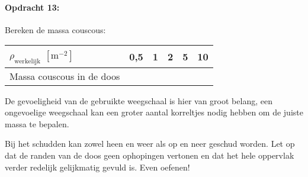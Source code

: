 \bigskip{}


\begin{minipage}[t]{1\columnwidth}%

\paragraph{Opdracht 13:}

Bereken de massa couscous:\smallskip{}

\begin{tabular}{|x{.3\textwidth}|x{.1\textwidth}|x{.1\textwidth}
                |x{.1\textwidth}|x{.1\textwidth}|x{.1\textwidth}|}
    \hline
    $\rho_\textrm{werkelijk}$ $\left[\mathrm{m^{-2}}\right]$ & 0,5 & 1 & 2 & 5 & 10 \\
    \hline
    Massa couscous in de doos &  &  &  &  & \\
    \hline
\end{tabular}

\smallskip{}


De gevoeligheid van de gebruikte weegschaal is hier van groot belang,
een ongevoelige weegschaal kan een groter aantal korreltjes nodig
hebben om de juiste massa te bepalen.%
\end{minipage}

\bigskip{}


Bij het schudden kan zowel heen en weer als op en neer geschud worden.
Let op dat de randen van de doos geen ophopingen vertonen en dat het
hele oppervlak verder redelijk gelijkmatig gevuld is. Even oefenen!

\bigskip{}


